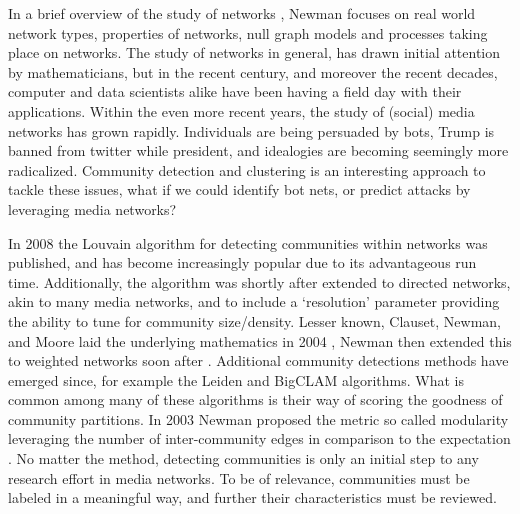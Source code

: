 \documentclass[a4paper, 12pt, twocolumn]{article}
\begin{document}
In a brief overview of the study of networks \cite{struc_funct_cnets}, Newman focuses on real world network types, properties of networks, null graph models and processes taking place on networks. 
The study of networks in general, has drawn initial attention by mathematicians, but in the recent century, and moreover the recent decades, computer and data scientists alike have been having a field day with their applications. 
Within the even more recent years, the study of (social) media networks has grown rapidly. 
Individuals are being persuaded by bots, Trump is banned from twitter while president, and idealogies are becoming seemingly more radicalized.
Community detection and clustering is an interesting approach to tackle these issues, what if we could identify bot nets, or predict attacks by leveraging media networks?

In 2008 the Louvain algorithm \cite{louvain} for detecting communities within networks was published, and has become increasingly popular due to its advantageous run time. 
Additionally, the algorithm was shortly after extended to directed networks, akin to many media networks, and to include a `resolution' parameter \cite{louvain_resolution, com_struct_indir} providing the ability to tune for community size/density. 
Lesser known, Clauset, Newman, and Moore laid the underlying mathematics in 2004 \cite{finding_comm_struct}, Newman then extended this to weighted networks soon after \cite{analysis_of_wnets}. 
Additional community detections methods have emerged since, for example the Leiden \cite{louvain_2_leiden} and BigCLAM \cite{bigclam} algorithms. 
What is common among many of these algorithms is their way of scoring the goodness of community partitions. 
In 2003 Newman proposed the metric so called modularity leveraging the number of inter-community edges in comparison to the expectation \cite{finding_and_evaling_comm_struct}.
No matter the method, detecting communities is only an initial step to any research effort in media networks. 
To be of relevance, communities must be labeled in a meaningful way, and further their characteristics must be reviewed. 
\end{document}
